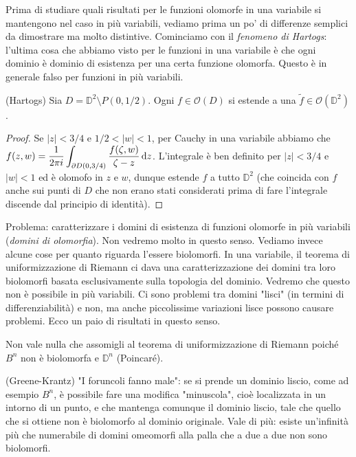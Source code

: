 Prima di studiare quali risultati per le funzioni olomorfe in una variabile si mantengono nel caso in più variabili, vediamo prima un po' di differenze semplici da dimostrare ma molto distintive. Cominciamo con il \textit{fenomeno di Hartogs}: l'ultima cosa che abbiamo visto per le funzioni in una variabile è che ogni dominio è dominio di esistenza per una certa funzione olomorfa. Questo è in generale falso per funzioni in più variabili.

\begin{prop}
  (Hartogs) Sia $D=\mathbb{D}^2\setminus P(0,1/2)$. Ogni $f \in \mathcal{O}(D)$ si estende a una $\tilde{f} \in \mathcal{O}(\mathbb{D}^2)$.
\end{prop}

\begin{proof}
  Se $|z|<3/4$ e $1/2<|w|<1$, per Cauchy in una variabile abbiamo che $\displaystyle f(z,w)=\frac{1}{2\pi i}\int_{\partial D(0, 3/4)} \frac{f(\zeta, w)}{\zeta-z}\mathop{}\!\mathrm{d} z$. L'integrale è ben definito per $|z|<3/4$ e $|w|<1$ ed è olomofo in $z$ e $w$, dunque estende $f$ a tutto $\mathbb{D}^2$ (che coincida con $f$ anche sui punti di $D$ che non erano stati considerati prima di fare l'integrale discende dal principio di identità).
\end{proof}

Problema: caratterizzare i domini di esistenza di funzioni olomorfe in più variabili (\textit{domini di olomorfia}). Non vedremo molto in questo senso. Vediamo invece alcune cose per quanto riguarda l'essere biolomorfi. In una variabile, il teorema di uniformizzazione di Riemann ci dava una caratterizzazione dei domini tra loro biolomorfi basata esclusivamente sulla topologia del dominio. Vedremo che questo non è possibile in più variabili. Ci sono problemi tra domini "lisci" (in termini di differenziabilità) e non, ma anche piccolissime variazioni lisce possono causare problemi. Ecco un paio di risultati in questo senso.

\begin{ex}
  Non vale nulla che assomigli al teorema di uniformizzazione di Riemann poiché $B^n$ non è biolomorfa e $\mathbb{D}^n$ (Poincaré).
\end{ex}

\begin{ex}
  (Greene-Krantz) "I foruncoli fanno male": se si prende un dominio liscio, come ad esempio $B^n$, è possibile fare una modifica "minuscola", cioè localizzata in un intorno di un punto, e che mantenga comunque il dominio liscio, tale che quello che si ottiene non è biolomorfo al dominio originale. Vale di più: esiste un'infinità più che numerabile di domini omeomorfi alla palla che a due a due non sono biolomorfi.
\end{ex}


